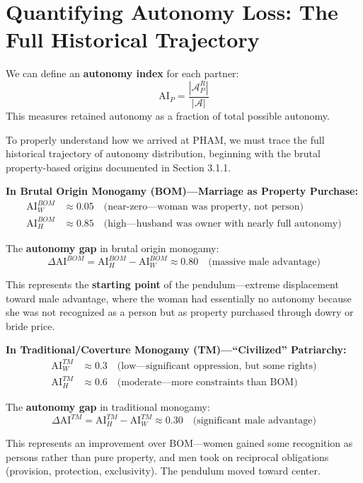 \documentclass[12pt,openany]{book}
\numberwithin{equation}{chapter}
\begin{document}
\section{Quantifying Autonomy Loss: The Full Historical Trajectory}

We can define an \textbf{autonomy index} for each partner:
\[
\text{AI}_P = \frac{|\mathcal{A}_P^R|}{|\mathcal{A}|}
\]
This measures retained autonomy as a fraction of total possible autonomy.

To properly understand how we arrived at PHAM, we must trace the full historical trajectory of autonomy distribution, beginning with the brutal property-based origins documented in Section 3.1.1.

\textbf{In Brutal Origin Monogamy (BOM)---Marriage as Property Purchase:}
\begin{align*}
\text{AI}_W^{BOM} &\approx 0.05 \quad \text{(near-zero---woman was property, not person)} \\
\text{AI}_H^{BOM} &\approx 0.85 \quad \text{(high---husband was owner with nearly full autonomy)}
\end{align*}

The \textbf{autonomy gap} in brutal origin monogamy:
\[
\Delta \text{AI}^{BOM} = \text{AI}_H^{BOM} - \text{AI}_W^{BOM} \approx 0.80 \quad \text{(massive male advantage)}
\]

This represents the \textbf{starting point} of the pendulum---extreme displacement toward male advantage, where the woman had essentially no autonomy because she was not recognized as a person but as property purchased through dowry or bride price.

\textbf{In Traditional/Coverture Monogamy (TM)---``Civilized'' Patriarchy:}
\begin{align*}
\text{AI}_W^{TM} &\approx 0.3 \quad \text{(low---significant oppression, but some rights)} \\
\text{AI}_H^{TM} &\approx 0.6 \quad \text{(moderate---more constraints than BOM)}
\end{align*}

The \textbf{autonomy gap} in traditional monogamy:
\[
\Delta \text{AI}^{TM} = \text{AI}_H^{TM} - \text{AI}_W^{TM} \approx 0.30 \quad \text{(significant male advantage)}
\]

This represents an improvement over BOM---women gained some recognition as persons rather than pure property, and men took on reciprocal obligations (provision, protection, exclusivity). The pendulum moved toward center.
\end{document}
